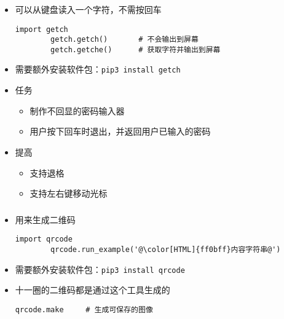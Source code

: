 \begin{CJK}{UTF8}{gbsn}
\begin{frame} [fragile]
	\frametitle{}
	\linespread{1.25}
	\begin{itemize}
	\item {}可以从键盘读入一个字符，不需按回车
		\begin{lstlisting}[style=pythonstyle, gobble=8, texcl, escapechar=@]
		import getch
		getch.getch()		# 不会输出到屏幕
		getch.getche()		# 获取字符并输出到屏幕
		\end{lstlisting}
	\item 需要额外安装软件包：\texttt{pip3 install getch}
	\item 任务
		\begin{itemize}
		\item 制作不回显的密码输入器
		\item 用户按下回车时退出，并返回用户已输入的密码
		\end{itemize}
	\item 提高
		\begin{itemize}
		\item 支持退格
		\item 支持左右键移动光标
		\end{itemize}
	\end{itemize}
\begin{comment}
import getch
def getpass() :
	l, r = '', ''
	while True :
		c = getch.getch()
		if c == '\n' :
			return l + r
		elif c == '\x7f' :
			l = l[:-1]
		elif c == '\x1b' :	# Backspace
			assert getch.getch() == '['
			c = getch.getch()
			if c == 'C' :	# Right
				if r :
					l += r[0]
					r = r[1:]
			elif c == 'D' :	# Left
				if l :
					r = l[-1] + r
					l = l[:-1]
			elif c == '3' :	# Delete
				assert getch.getch() == '~'
				r = r[1:]
		else :
			l += c
\end{comment}
\end{frame}

\begin{frame} [fragile]
	\frametitle{}
	\linespread{1.5}
	\begin{itemize}
	\item {}用来生成二维码
		\begin{lstlisting}[style=pythonstyle, gobble=8, texcl, escapechar=@]
		import qrcode
		qrcode.run_example('@\color[HTML]{ff0bff}内容字符串@')
		\end{lstlisting}
	\item 需要额外安装软件包：\texttt{pip3 install qrcode}
	\item 十一圈的二维码都是通过这个工具生成的
		\begin{lstlisting}[style=pythonstyle, gobble=8, texcl]
		qrcode.make		# 生成可保存的图像
		\end{lstlisting}
	\end{itemize}
\end{frame}


\end{CJK}
